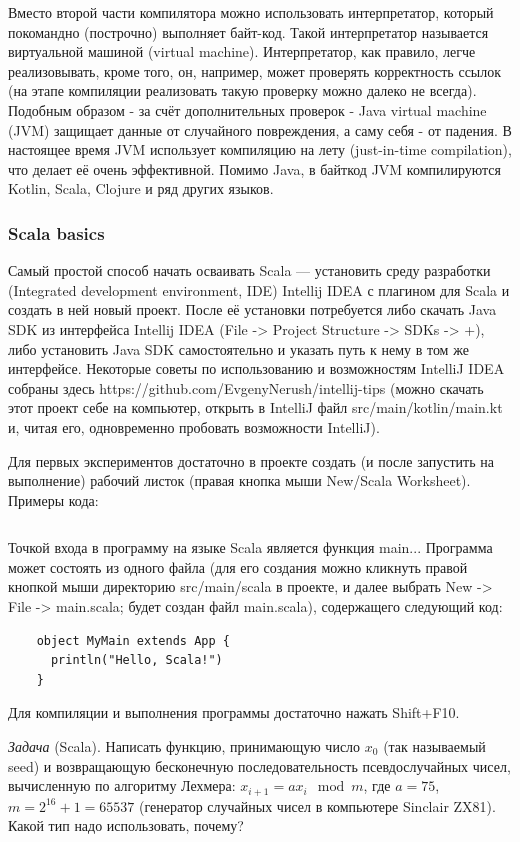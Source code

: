 \documentclass{book}
\begin{document}
Вместо второй части компилятора можно использовать интерпретатор, который покомандно (построчно)
выполняет байт-код. Такой интерпретатор называется виртуальной машиной (virtual machine).
Интерпретатор, как правило, легче реализовывать, кроме того, он, например, может проверять
корректность ссылок (на этапе компиляции реализовать такую проверку можно далеко не всегда).
Подобным образом - за счёт дополнительных проверок - Java virtual machine (JVM) защищает данные от
случайного повреждения, а саму себя - от падения. В настоящее время JVM использует компиляцию на
лету (just-in-time compilation), что делает её очень эффективной. Помимо Java, в байткод JVM
компилируются Kotlin, Scala, Clojure и ряд других языков.

\subsubsection{Scala basics}

Самый простой способ начать осваивать Scala --- установить среду разработки (Integrated development
environment, IDE) Intellij IDEA с плагином для Scala и создать в ней новый проект. После её
установки потребуется либо скачать Java SDK из интерфейса Intellij IDEA (File -> Project Structure
-> SDKs -> +), либо установить Java SDK самостоятельно и указать путь к нему в том же интерфейсе.
Некоторые советы по использованию и возможностям IntelliJ IDEA собраны здесь
https://github.com/EvgenyNerush/intellij-tips (можно скачать этот проект себе на компьютер, открыть
в IntelliJ файл src/main/kotlin/main.kt и, читая его, одновременно пробовать возможности IntelliJ).

Для первых экспериментов достаточно в проекте создать (и после запустить на выполнение) рабочий
листок (правая кнопка мыши New/Scala Worksheet). Примеры кода:

\inputminted{scala}{scalaBasics.sc}

Точкой входа в программу на языке Scala является функция main...
Программа может состоять из одного файла (для его создания можно кликнуть правой кнопкой мыши директорию src/main/scala в проекте, и далее
выбрать New -> File -> main.scala; будет создан файл main.scala), содержащего следующий код:
\begin{verbatim}
    object MyMain extends App {
      println("Hello, Scala!")
    }
\end{verbatim}
Для компиляции и выполнения программы достаточно нажать Shift+F10.

\textit{Задача} (Scala). Написать функцию, принимающую число $x_0$ (так называемый seed) и
возвращающую бесконечную последовательность псевдослучайных чисел, вычисленную по алгоритму
Лехмера: $x_{i+1} = a x_i \mod m$, где $a = 75$, $m = 2^{16} + 1 = 65537$ (генератор случайных
чисел в компьютере Sinclair ZX81). Какой тип надо использовать, почему?
\end{document}
